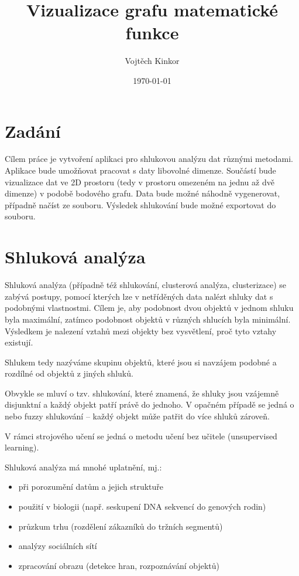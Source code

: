 \documentclass[pdftex,a4paper]{article}
\title{Vizualizace grafu matematické funkce}
\author{Vojtěch Kinkor}
\date{\today}
\newcommand*{\parvsp}{\par\vspace{\baselineskip}\noindent}
\begin{document}


\newpage
\tableofcontents
\newpage




\section{Zadání}

Cílem práce je vytvoření aplikaci pro shlukovou analýzu dat různými metodami. Aplikace bude umožňovat pracovat s daty libovolné dimenze. Součástí bude vizualizace dat ve 2D prostoru (tedy v prostoru omezeném na jednu až dvě dimenze) v podobě bodového grafu. Data bude možné náhodně vygenerovat, případně načíst ze souboru. Výsledek shlukování bude možné exportovat do souboru.




\section{Shluková analýza}

Shluková analýza (případně též shlukování, clusterová analýza, clusterizace) se zabývá postupy, pomocí kterých lze v netříděných data nalézt shluky dat s podobnými vlastnostmi. Cílem je, aby podobnost dvou objektů v jednom shluku byla maximální, zatímco podobnost objektů v různých shlucích byla minimální. Výsledkem je nalezení vztahů mezi objekty bez vysvětlení, proč tyto vztahy existují.

Shlukem tedy nazýváme skupinu objektů, které jsou si navzájem podobné a rozdílné od objektů z jiných shluků.

Obvykle se mluví o tzv.  shlukování, které znamená, že shluky jsou vzájemně disjunktní a každý objekt patří právě do jednoho. V opačném případě se jedná o  nebo fuzzy shlukování -- každý objekt může patřit do více shluků zároveň.

V rámci strojového učení se jedná o metodu učení bez učitele (unsupervised learning).

\parvsp
Shluková analýza má mnohé uplatnění, mj.:
\begin{itemize}
	\item při porozumění datům a jejich struktuře
	\item použití v biologii (např. seskupení DNA sekvencí do genových rodin)
	\item průzkum trhu (rozdělení zákazníků do tržních segmentů)
	\item analýzy sociálních sítí
	\item zpracování obrazu (detekce hran, rozpoznávání objektů)
\end{itemize}
\end{document}
